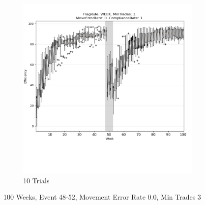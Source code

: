 \documentclass{article}%
\begin{document}
\begin{figure}[!htb]
\begin{subfigure}[b]{0.45\linewidth}
\includegraphics[clip,width=\linewidth,trim=0 4cm 0 0]{0030fr_WEEK_mt_3_er_0_cr_1_t10.png}%
\caption{10 Trials}%
\end{subfigure}%
\caption{100 Weeks, Event 48{-}52, Movement Error Rate 0.0, Min Trades 3}%
\end{figure}

%
\end{document}
